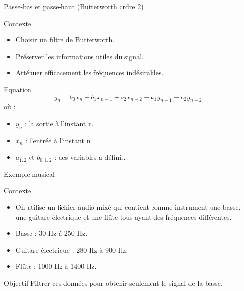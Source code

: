 \begin{frame}{Passe-bas et passe-haut (Butterworth ordre 2)}

\vspace{5mm}

\begin{block}{Contexte}
    
    \begin{itemize}
        \item Choisir un filtre de Butterworth.
        \item Préserver les informations utiles du signal.
        \item Atténuer efficacement les fréquences indésirables.
    \end{itemize}
\end{block}

\vspace{-2mm}

    \begin{block}{Equation}
    $$y_{n} = b_{0}x_{n} + b_{1}x_{n-1} + b_{2}x_{n-2} - a_{1}y_{n-1} - a_{2}y_{n-2}$$
    où :
    \begin{itemize}
        \item $y_{n}$ : la sortie à l'instant n.
        \item $x_{n}$ : l'entrée à l'instant n.
        \item $a_{1,2}$ et $b_{0,1,2}$ : des variables a définir.
    \end{itemize}
    \end{block}
\end{frame}

\begin{frame}{Exemple musical}
    \begin{block}{Contexte}
\begin{itemize}
    \item On utilise un fichier audio mixé qui contient comme instrument une basse, une guitare électrique et une flûte tous ayant des fréquences différentes.
    \item Basse : 30 Hz à 250 Hz.
    \item Guitare électrique : 280 Hz à 900 Hz.
    \item Flûte : 1000 Hz à 1400 Hz.
\end{itemize}
    \end{block}
    
    \begin{block}{Objectif}
        Filtrer ces données pour obtenir seulement le signal de la basse.
    \end{block}
\end{frame}

